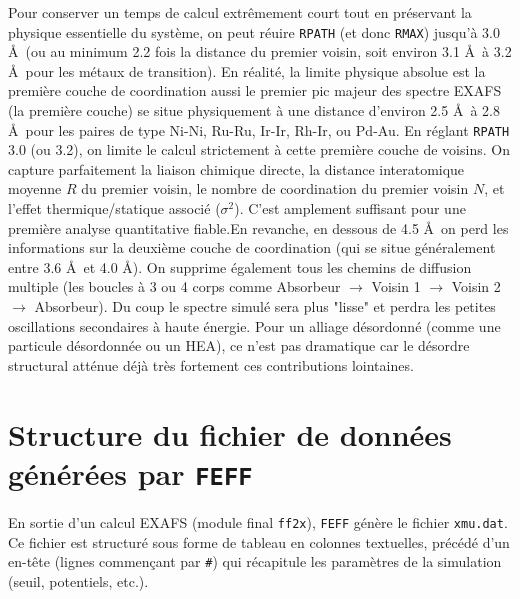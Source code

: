 \documentclass[12pt,a4paper,french]{book}
\begin{document}
Pour conserver un temps de calcul extrêmement court tout en préservant la physique essentielle du système, on peut réuire \verb+RPATH+ (et donc \verb+RMAX+) jusqu'à 3.0 \AA\ (ou au minimum 2.2 fois la distance du premier voisin, soit environ 3.1 \AA\ à 3.2 \AA\ pour les métaux de transition). En réalité, la limite physique absolue est la première couche de coordination aussi le premier pic majeur des spectre EXAFS (la première couche) se situe physiquement à une distance d'environ 2.5 \AA\ à 2.8 \AA\ pour les paires de type Ni-Ni, Ru-Ru, Ir-Ir, Rh-Ir, ou Pd-Au. En réglant \verb+RPATH+ 3.0 (ou 3.2), on limite le calcul strictement à cette première couche de voisins.  On capture parfaitement la liaison chimique directe, la distance interatomique moyenne $R$ du premier voisin, le nombre de coordination du premier voisin $N$, et l'effet thermique/statique associé ($\sigma^2$). C'est amplement suffisant pour une première analyse quantitative fiable.En revanche, en dessous de 4.5 \AA\, on perd les informations sur la deuxième couche de coordination (qui se situe généralement entre 3.6 \AA\ et 4.0 \AA). On supprime également  tous les chemins de diffusion multiple (les boucles à 3 ou 4 corps comme Absorbeur $\rightarrow$ Voisin 1 $\rightarrow$ Voisin 2 $\rightarrow$ Absorbeur). Du coup le spectre simulé sera plus "lisse" et perdra les petites oscillations secondaires à haute énergie. Pour un alliage désordonné (comme une particule désordonnée ou un HEA), ce n'est pas dramatique car le désordre structural atténue déjà très fortement ces contributions lointaines.  

\cprotect\section{Structure du fichier de données générées par \verb+FEFF+}
En sortie d'un calcul EXAFS (module final \verb+ff2x+), \verb+FEFF+ génère le fichier \verb+xmu.dat+.
Ce fichier est structuré sous forme de tableau en colonnes textuelles, précédé d'un en-tête (lignes commençant par \verb+#+) qui récapitule les paramètres de la simulation (seuil, potentiels, etc.).
\end{document}
